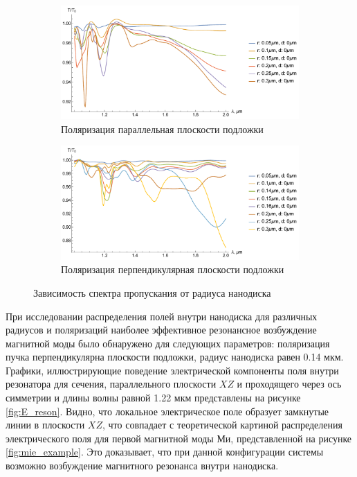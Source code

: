 \begin{figure}[h]
	\begin{subfigure}[b]{\textwidth}
		\centering
		\includegraphics[width=.9\textwidth]{img/total_d0_theta_0}
		\caption{Поляризация параллельная плоскости подложки}
		\label{fig:1x_fixed_d_theta_0}
	\end{subfigure}

	\begin{subfigure}[b]{\textwidth}
		\centering
		\includegraphics[width=.9\textwidth]{img/total_d0_theta_90}
		\caption{Поляризация перпендикулярная плоскости подложки}
		\label{fig:1x_fixed_d_theta_90}
	\end{subfigure}
  
  	\caption{Зависимость спектра пропускания от радиуса нанодиска}
  	\label{fig:1x_fixed_d}
\end{figure}

При исследовании распределения полей внутри нанодиска для различных радиусов и поляризаций наиболее эффективное резонансное возбуждение магнитной моды было обнаружено для следующих параметров: поляризация пучка перпендикулярна плоскости подложки, радиус нанодиска равен 0.14 мкм. Графики, иллюстрирующие поведение электрической компоненты поля внутри резонатора для сечения, параллельного плоскости $XZ$ и проходящего через ось симметрии и длины волны равной 1.22 мкм представлены на рисунке \ref{fig:E_reson}. Видно, что локальное электрическое поле образует замкнутые линии в плоскости $XZ$, что совпадает с теоретической картиной распределения электрического поля для первой магнитной моды Ми, представленной на рисунке \ref{fig:mie_example}. Это доказывает, что при данной конфигурации системы возможно возбуждение магнитного резонанса внутри нанодиска.

